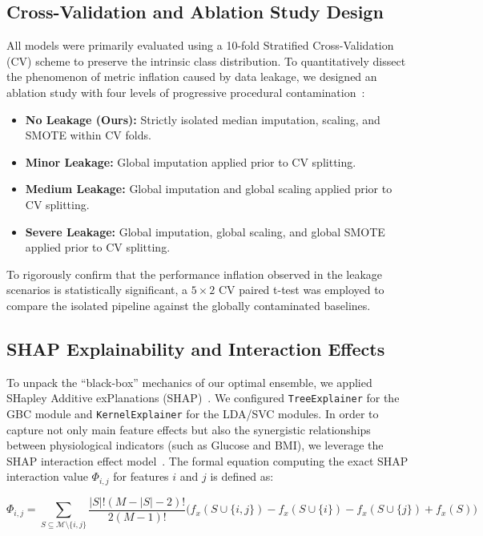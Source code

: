 \documentclass[3p,twocolumn]{elsarticle}
\begin{document}
\subsection{Cross-Validation and Ablation Study Design}

All models were primarily evaluated using a 10-fold Stratified Cross-Validation (CV) scheme to preserve the intrinsic class distribution. To quantitatively dissect the phenomenon of metric inflation caused by data leakage, we designed an ablation study with four levels of progressive procedural contamination~\cite{Kapoor2024Leakage}:

\begin{itemize}
    \item \textbf{No Leakage (Ours):} Strictly isolated median imputation, scaling, and SMOTE within CV folds.
    \item \textbf{Minor Leakage:} Global imputation applied prior to CV splitting.
    \item \textbf{Medium Leakage:} Global imputation and global scaling applied prior to CV splitting.
    \item \textbf{Severe Leakage:} Global imputation, global scaling, and global SMOTE applied prior to CV splitting.
\end{itemize}

To rigorously confirm that the performance inflation observed in the leakage scenarios is statistically significant, a $5 \times 2$ CV paired t-test was employed to compare the isolated pipeline against the globally contaminated baselines.

\subsection{SHAP Explainability and Interaction Effects}

To unpack the ``black-box'' mechanics of our optimal ensemble, we applied SHapley Additive exPlanations (SHAP)~\cite{Lundberg2017SHAP}. We configured \texttt{TreeExplainer} for the GBC module and \texttt{KernelExplainer} for the LDA/SVC modules. In order to capture not only main feature effects but also the synergistic relationships between physiological indicators (such as Glucose and BMI), we leverage the SHAP interaction effect model~\cite{Kapoor2024Leakage}. The formal equation computing the exact SHAP interaction value $\Phi_{i,j}$ for features $i$ and $j$ is defined as:

\begin{equation}
\Phi_{i,j} = \sum_{S \subseteq \mathcal{M} \setminus \{i,j\}} \frac{|S|! (M - |S| - 2)!}{2(M - 1)!} \Big( f_x(S \cup \{i,j\}) - f_x(S \cup \{i\}) - f_x(S \cup \{j\}) + f_x(S) \Big)
\end{equation}
\end{document}
